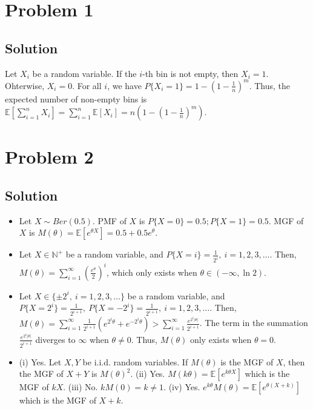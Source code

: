 \documentclass[11pt]{report}
\newcommand{\E}[1]{\mathbb{E}\left[#1\right]}
\begin{document}

\section*{Problem 1}
\subsection*{Solution}
Let $X_i$ be a random variable. If the $i$-th bin is not empty, then $X_i = 1$. Ohterwise, $X_i = 0$. For all $i$, we have $P\{X_i = 1\} = 1 - (1-\frac{1}{n})^m$. Thus, the expected number of non-empty bins is $\E{\sum_{i=1}^{n} X_i} = \sum_{i=1}^{n}\E{X_i} = n(1 - (1-\frac{1}{n})^m)$.
\section*{Problem 2}
\subsection*{Solution}
\begin{itemize}
  \item Let $X \sim Ber(0.5)$. PMF of $X$ is $P\{X = 0\} = 0.5; P\{X = 1\} = 0.5$. MGF of $X$ is $M(\theta) = \E{e^{\theta X}} = 0.5 + 0.5 e^\theta$.
  \item Let $X \in \mathbb{N}^+$ be a random variable, and $P\{X = i\} = \frac{1}{2^i},~i=1,2,3,\dots$. Then, $M(\theta) = \sum_{i=1}^{\infty}(\frac{e^\theta}{2})^i$, which only exists when $\theta \in (-\infty, \ln 2)$.
  \item Let $X \in \{\pm 2^i,~i=1,2,3,\dots\}$ be a random variable, and $P\{X = 2^i\} = \frac{1}{2^{i+1}},~P\{X = -2^i\} = \frac{1}{2^{i+1}},~i=1,2,3,\dots$. Then, $M(\theta) = \sum_{i=1}^{\infty}\frac{1}{2^{i+1}}(e^{2^i\theta}+e^{-2^i\theta}) > \sum_{i=1}^{\infty}\frac{e^{2^i\left|\theta\right|}}{2^{i+1}}$. The term in the summation $\frac{e^{2^i\left|\theta\right|}}{2^{i+1}}$ diverges to $\infty$ when $\theta \neq 0$. Thus, $M(\theta)$ only exists when $\theta = 0$.
  \item (i) Yes. Let $X, Y$ be i.i.d. random variables. If $M(\theta)$ is the MGF of $X$, then the MGF of $X+Y$ is $M(\theta)^2$. (ii) Yes. $M(k\theta) = \E{e^{k \theta X}}$ which is the MGF of $kX$. (iii) No. $k M(0) = k \neq 1$. (iv) Yes. $e^{k\theta}M(\theta) = \E{e^{\theta(X+k)}}$ which is the MGF of $X+k$.
\end{itemize}
\end{document}

